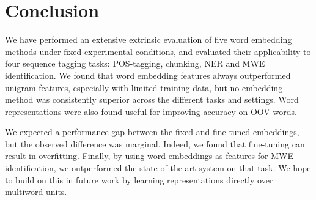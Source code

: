 \section{Conclusion}
We have performed an extensive extrinsic evaluation of five word embedding methods
under fixed experimental conditions, and evaluated their applicability to four sequence tagging tasks: POS-tagging, chunking, NER and MWE identification.
We found that word embedding features always outperformed unigram features, especially with limited training data, but no embedding method was consistently superior across the different tasks and settings.
Word representations were also found useful for improving accuracy on OOV words.

We expected a performance gap between the fixed and fine-tuned embeddings, but the observed difference was marginal.
Indeed, we found that fine-tuning can result in overfitting.
Finally, by using word embeddings as features for MWE identification, we outperformed 
the state-of-the-art system on that task.
We hope to build on this in future work by learning representations directly over multiword units.
